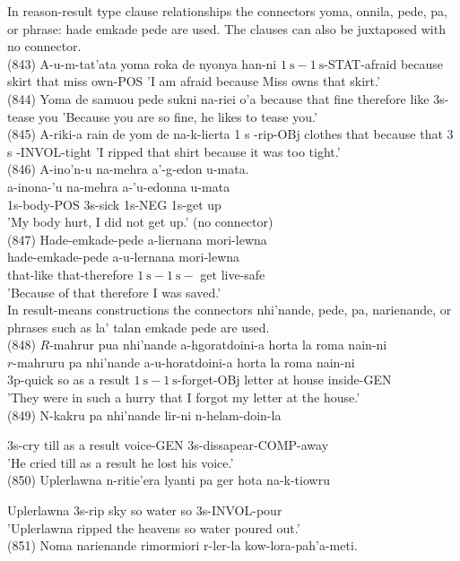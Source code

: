 \documentclass[10pt]{article}
\begin{document}
In reason-result type clause relationships the connectors yoma, onnila, pede, pa, or phrase: hade emkade pede are used. The clauses can also be juxtaposed with no connector.\\
(843) A-u-m-tat'ata yoma roka de nyonya han-ni \(1 \mathrm{~s}-1 \mathrm{~s}\)-STAT-afraid because skirt that miss own-POS 'I am afraid because Miss owns that skirt.'\\
(844) Yoma de samuou pede sukni na-riei o'a because that fine therefore like 3s-tease you 'Because you are so fine, he likes to tease you.'\\
(845) A-riki-a rain de yom de na-k-lierta 1 s -rip-OBj clothes that because that 3 s -INVOL-tight 'I ripped that shirt because it was too tight.'\\
(846) A-ino'n-u na-mehra a'-g-edon u-mata.\\
a-inona-'u na-mehra a-'u-edonna u-mata\\
1s-body-POS 3s-sick 1s-NEG 1s-get up\\
'My body hurt, I did not get up.' (no connector)\\
(847) Hade-emkade-pede a-liernana mori-lewna\\
hade-emkade-pede a-u-lernana mori-lewna\\
that-like that-therefore \(1 \mathrm{~s}-1 \mathrm{~s}-\) get live-safe\\
'Because of that therefore I was saved.'\\
In result-means constructions the connectors nhi'nande, pede, pa, narienande, or phrases such as la' talan emkade pede are used.\\
(848) \(R\)-mahrur pua nhi'nande a-hgoratdoini-a horta la roma nain-ni\\
\(r\)-mahruru pa nhi'nande a-u-horatdoini-a horta la roma nain-ni\\
3p-quick so as a result \(1 \mathrm{~s}-1 \mathrm{~s}\)-forget-OBj letter at house inside-GEN\\
'They were in such a hurry that I forgot my letter at the house.'\\
(849) N-kakru pa nhi'nande lir-ni n-helam-doin-la

3s-cry till as a result voice-GEN 3s-dissapear-COMP-away\\
'He cried till as a result he lost his voice.'\\
(850) Uplerlawna n-ritie'era lyanti pa ger hota na-k-tiowru

Uplerlawna 3s-rip sky so water so 3s-INVOL-pour\\
'Uplerlawna ripped the heavens so water poured out.'\\
(851) Noma narienande rimormiori r-ler-la kow-lora-pah'a-meti.
\end{document}

